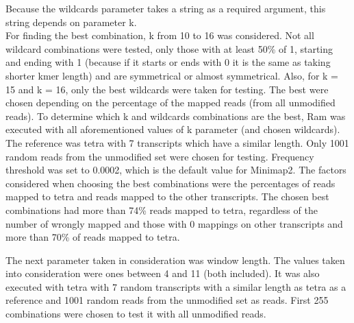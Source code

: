 \documentclass[times, utf8, zavrsni, numeric]{fer}
\begin{document}
Because the wildcards parameter takes a string as a required argument, this string depends on parameter k. \\
For finding the best combination, k from 10 to 16 was considered. Not all wildcard combinations were tested, 
only those with at least 50\% of 1, starting and ending with 1 (because if it starts or ends with 0 it is 
the same as taking shorter kmer length) and are symmetrical or almost symmetrical.
Also, for k = 15 and k = 16, only the best wildcards were taken for testing. The best were chosen depending 
on the percentage of the mapped reads (from all unmodified reads). To determine which k and wildcards
combinations are the best, Ram was executed with all aforementioned values of k parameter (and chosen wildcards). 
The reference was tetra with 7 transcripts which have a similar length. 
Only 1001 random reads from the unmodified set were chosen for testing. Frequency threshold was set to 0.0002, 
which is the default value for Minimap2. The factors considered when choosing the best combinations were 
the percentages of reads mapped to tetra and reads mapped to the other transcripts. The chosen best combinations
had more than 74\% reads mapped to tetra, regardless of the number of wrongly mapped and
those with 0 mappings on other transcripts and more than 70\% of reads mapped to tetra.

The next parameter taken in consideration was window length. The values taken into consideration were
ones between 4 and 11 (both included). It was also executed with tetra with 7 random transcripts with a similar 
length as tetra as a reference and  1001 random reads from the unmodified set as reads. 
First 255 combinations were chosen to test it with all unmodified reads. 
\end{document}
